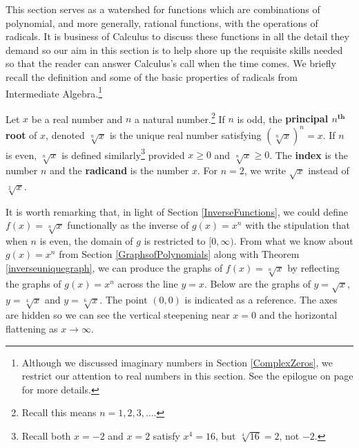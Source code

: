 

\setcounter{footnote}{0}

\label{AlgebraicFunctions}

This section serves as a watershed for functions which are combinations of polynomial, and more generally, rational functions, with the operations of radicals.  It is business of Calculus to discuss these functions in all the detail they demand so our aim in this section is to help shore up the requisite skills needed so that the reader can answer Calculus's call when the time comes.   We briefly recall the definition and some of the basic properties of radicals from Intermediate Algebra.\footnote{Although we discussed imaginary numbers in Section \ref{ComplexZeros}, we restrict our attention to real numbers in this section.  See the epilogue on page \pageref{complexepilogue} for more details.} 

\smallskip

\colorbox{ResultColor}{\bbm

\begin{defn} \label{principalnthrootdefn} Let $x$ be a real number and $n$ a natural number.\footnote{Recall this means $n=1,2,3,\ldots$.} If $n$ is odd, the   \textbf{principal \boldmath $n^{\textbf{th}}$ root} of $x$, denoted $\sqrt[n]{x}$ is the unique real number satisfying $\left(\sqrt[n]{x}\right)^n = x$.  If $n$ is even, $\sqrt[n]{x}$ is defined similarly\footnote{Recall both $x=-2$ and $x=2$ satisfy $x^4=16$, but $\sqrt[4]{16} =2$, not $-2$.} provided  $x \geq 0$ and $\sqrt[n]{x} \geq 0$.  The   \textbf{index} is the number $n$ and the   \textbf{radicand} is the number $x$.  For $n=2$, we write $\sqrt{x}$ instead of $\sqrt[2]{x}$.

\end{defn}

\ebm}

\smallskip

It is worth remarking that, in light of Section \ref{InverseFunctions}, we could define $f(x) = \sqrt[n]{x}$ functionally as the inverse of $g(x) = x^n$ with the stipulation that when $n$ is even, the domain of $g$ is restricted to $[0, \infty)$. From what we know about $g(x) = x^n$ from Section \ref{GraphsofPolynomials} along with Theorem \ref{inverseuniquegraph}, we can produce the graphs of $f(x) = \sqrt[n]{x}$ by reflecting the graphs of $g(x) = x^n$ across the line $y=x$.  Below are the graphs of $y=\sqrt{x}$, $y=\sqrt[4]{x}$ and $y=\sqrt[6]{x}$.  The point $(0,0)$ is indicated as a reference.  The axes are hidden so we can see the vertical steepening near $x=0$ and the horizontal flattening as $x \rightarrow \infty$.

